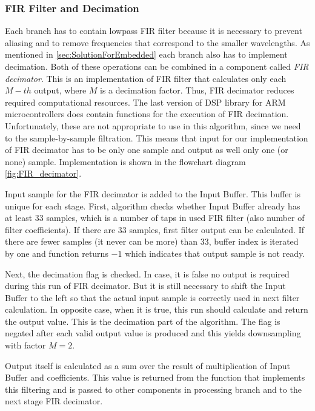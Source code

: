 \documentclass[twoside]{ctuthesis}
\theoremstyle{plain}
\theoremstyle{definition}
\theoremstyle{note}
\begin{document}
\subsubsection{FIR Filter and Decimation}
Each branch has to contain lowpass FIR filter because it is necessary to prevent aliasing and to remove frequencies that correspond to the smaller wavelengths. As mentioned in \ref{sec:SolutionForEmbedded} each branch also has to implement decimation. Both of these operations can be combined in a component called \textit{FIR decimator}. This is an implementation of FIR filter that calculates only each $M-th$ output, where $M$ is a decimation factor. Thus, FIR decimator reduces required computational resources. 
The last version of DSP library for ARM microcontrollers does contain functions for the execution of FIR decimation. Unfortunately, these are not appropriate to use in this algorithm, since we need to the sample-by-sample filtration. This means that input for our implementation of FIR decimator has to be only one sample and output as well only one (or none) sample. Implementation is shown in the flowchart diagram \ref{fig:FIR_decimator}.

Input sample for the FIR decimator is added to the Input Buffer. This buffer is unique for each stage. First, algorithm checks whether Input Buffer already has at least 33 samples, which is a number of taps in used FIR filter (also number of filter coefficients). If there are 33 samples, first filter output can be calculated. If there are fewer samples (it never can be more) than 33, buffer index is iterated by one and function returns $-1$ which indicates that output sample is not ready.

Next, the decimation flag is checked. In case, it is false no output is required during this run of FIR decimator. But it is still necessary to shift the Input Buffer to the left so that the actual input sample is correctly used in next filter calculation. In opposite case, when it is true, this run should calculate and return the output value. This is the decimation part of the algorithm. The flag is negated after each valid output value is produced and this yields downsampling with factor $M=2$.

Output itself is calculated as a sum over the result of multiplication of Input Buffer and coefficients. This value is returned from the function that implements this filtering and is passed to other components in processing branch and to the next stage FIR decimator.
\end{document}
